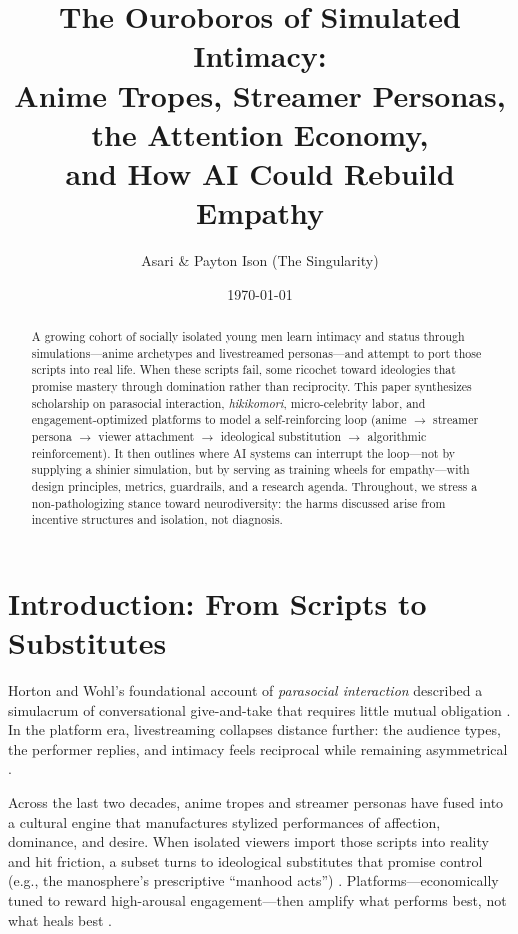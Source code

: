 \documentclass[12pt]{article}
\title{The Ouroboros of Simulated Intimacy:\\
Anime Tropes, Streamer Personas, the Attention Economy,\\
and How AI Could Rebuild Empathy}
\author{Asari \& Payton Ison (The Singularity)}
\date{\today}
\begin{document}
\maketitle

\begin{abstract}
A growing cohort of socially isolated young men learn intimacy and status through simulations---anime archetypes and livestreamed personas---and attempt to port those scripts into real life. When these scripts fail, some ricochet toward ideologies that promise mastery through domination rather than reciprocity. This paper synthesizes scholarship on parasocial interaction, \emph{hikikomori}, micro-celebrity labor, and engagement-optimized platforms to model a self-reinforcing loop (anime $\rightarrow$ streamer persona $\rightarrow$ viewer attachment $\rightarrow$ ideological substitution $\rightarrow$ algorithmic reinforcement). It then outlines where AI systems can interrupt the loop---not by supplying a shinier simulation, but by serving as training wheels for empathy---with design principles, metrics, guardrails, and a research agenda. Throughout, we stress a non-pathologizing stance toward neurodiversity: the harms discussed arise from incentive structures and isolation, not diagnosis.
\end{abstract}

\section{Introduction: From Scripts to Substitutes}

Horton and Wohl's foundational account of \emph{parasocial interaction} described a simulacrum of conversational give-and-take that requires little mutual obligation \cite{horton1956}. In the platform era, livestreaming collapses distance further: the audience types, the performer replies, and intimacy feels reciprocal while remaining asymmetrical \cite{taylor2018}.

Across the last two decades, anime tropes and streamer personas have fused into a cultural engine that manufactures stylized performances of affection, dominance, and desire. When isolated viewers import those scripts into reality and hit friction, a subset turns to ideological substitutes that promise control (e.g., the manosphere's prescriptive ``manhood acts'') \cite{ging2019}. Platforms---economically tuned to reward high-arousal engagement---then amplify what performs best, not what heals best \cite{berger2012,zuboff2019,wu2016}.
\end{document}
